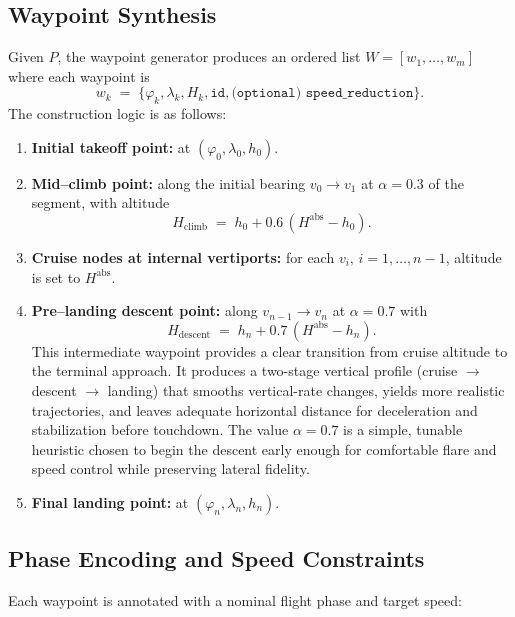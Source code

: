 \subsection{Waypoint Synthesis}
Given $P$, the waypoint generator produces an ordered list $W = [w_1,\dots,w_m]$ where each waypoint is
\begin{equation}
  w_k \;=\; \{\varphi_k, \lambda_k, H_k, \texttt{id}, \texttt{(optional) speed\_reduction}\}.
\end{equation}
The construction logic is as follows:
\begin{enumerate}
  \item \textbf{Initial takeoff point:} at $(\varphi_0,\lambda_0,h_0)$.
  \item \textbf{Mid–climb point:} along the initial bearing $v_0 \rightarrow v_1$ at
        \(\alpha=0.3\) of the segment, with altitude
        \begin{equation}
          H_{\text{climb}} \;=\; h_0 + 0.6\,(H^{\text{abs}} - h_0).
        \end{equation}
  \item \textbf{Cruise nodes at internal vertiports:} for each $v_i,\, i=1,\dots,n-1$,
        altitude is set to $H^{\text{abs}}$.
  \item \textbf{Pre–landing descent point:} along $v_{n-1} \rightarrow v_n$ at \(\alpha=0.7\)
        with
        \begin{equation}
          H_{\text{descent}} \;=\; h_n + 0.7\,(H^{\text{abs}} - h_n).
        \end{equation}
        This intermediate waypoint provides a clear transition from cruise altitude
        to the terminal approach. It produces a two-stage vertical profile
        (cruise $\rightarrow$ descent $\rightarrow$ landing) that smooths vertical-rate changes,
        yields more realistic trajectories, and leaves adequate horizontal distance
        for deceleration and stabilization before touchdown. The value
        \(\alpha=0.7\) is a simple, tunable heuristic chosen to begin the descent
        early enough for comfortable flare and speed control while preserving
        lateral fidelity.

  \item \textbf{Final landing point:} at $(\varphi_n,\lambda_n,h_n)$.
\end{enumerate}


\subsection{Phase Encoding and Speed Constraints}
Each waypoint is annotated with a nominal flight phase and target speed:


